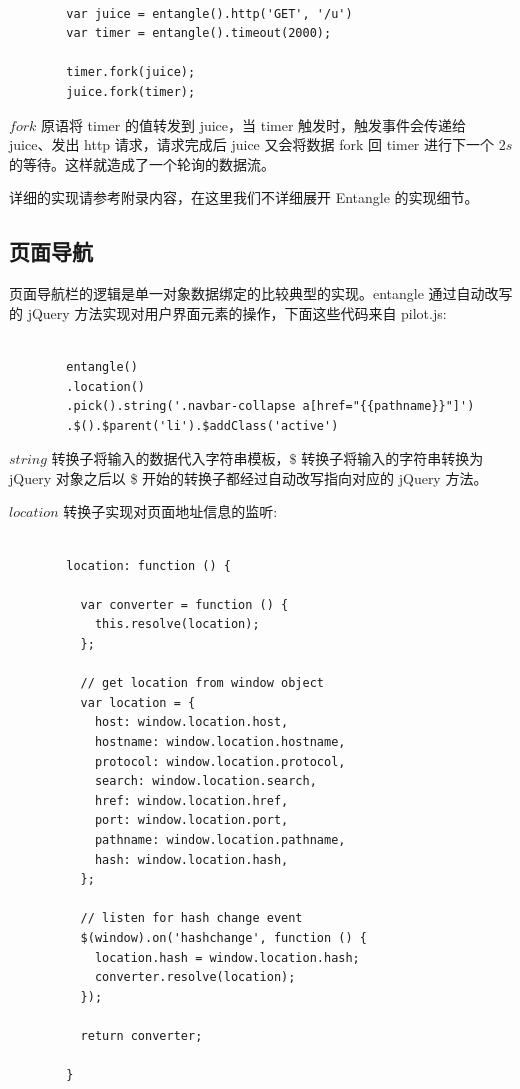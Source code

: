 \begin{verbatim}

        var juice = entangle().http('GET', '/u')
        var timer = entangle().timeout(2000);

        timer.fork(juice);
        juice.fork(timer);

\end{verbatim}

$fork$ 原语将 timer 的值转发到 juice，当 timer 触发时，触发事件会传递给 juice、发出 http 请求，请求完成后 juice 又会将数据 fork 回 timer 进行下一个 $2s$ 的等待。这样就造成了一个轮询的数据流。

详细的实现请参考附录内容，在这里我们不详细展开 Entangle 的实现细节。

\subsection{页面导航}

页面导航栏的逻辑是单一对象数据绑定的比较典型的实现。entangle 通过自动改写的 jQuery 方法实现对用户界面元素的操作，下面这些代码来自 pilot.js:

\begin{verbatim}

        entangle()
        .location()
        .pick().string('.navbar-collapse a[href="{{pathname}}"]')
        .$().$parent('li').$addClass('active')

\end{verbatim}

$string$ 转换子将输入的数据代入字符串模板，$\$$ 转换子将输入的字符串转换为 jQuery 对象之后以 \$ 开始的转换子都经过自动改写指向对应的 jQuery 方法。

$location$ 转换子实现对页面地址信息的监听:

\begin{verbatim}

        location: function () {

          var converter = function () {
            this.resolve(location);
          };

          // get location from window object
          var location = {
            host: window.location.host,
            hostname: window.location.hostname,
            protocol: window.location.protocol,
            search: window.location.search,
            href: window.location.href,
            port: window.location.port,
            pathname: window.location.pathname,
            hash: window.location.hash,
          };

          // listen for hash change event
          $(window).on('hashchange', function () {
            location.hash = window.location.hash;
            converter.resolve(location);
          });

          return converter;

        }

\end{verbatim}

